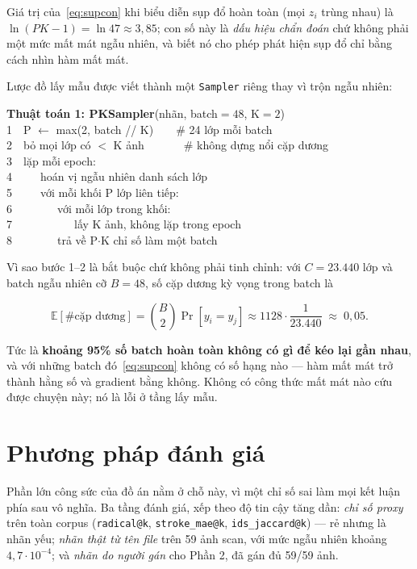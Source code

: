 \documentclass[conference,a4paper]{IEEEtran}
\newcommand{\code}[1]{{\small\texttt{#1}}}
\begin{document}
Giá trị của~\eqref{eq:supcon} khi biểu diễn sụp đổ hoàn toàn (mọi $z_i$ trùng nhau) là
$\ln(PK - 1) = \ln 47 \approx 3{,}85$; con số này là \emph{dấu hiệu chẩn đoán} chứ không phải một
mức mất mát ngẫu nhiên, và biết nó cho phép phát hiện sụp đổ chỉ bằng cách nhìn hàm mất mát.

\medskip
Lược đồ lấy mẫu được viết thành một \code{Sampler} riêng thay vì trộn ngẫu nhiên:

{\footnotesize\ttfamily\raggedright
\textbf{Thuật toán 1: PKSampler}(nhãn, batch$=48$, K$=2$)\\
1\ \ P $\leftarrow$ max(2, batch // K)\ \ \ \ \# 24 lớp mỗi batch\\
2\ \ bỏ mọi lớp có $<$ K ảnh\ \ \ \ \ \ \ \# không dựng nổi cặp dương\\
3\ \ lặp mỗi epoch:\\
4\ \ \ \ \ hoán vị ngẫu nhiên danh sách lớp\\
5\ \ \ \ \ với mỗi khối P lớp liên tiếp:\\
6\ \ \ \ \ \ \ \ với mỗi lớp trong khối:\\
7\ \ \ \ \ \ \ \ \ \ \ lấy K ảnh, không lặp trong epoch\\
8\ \ \ \ \ \ \ \ trả về P$\cdot$K chỉ số làm một batch\\
}

\medskip
Vì sao bước 1--2 là bắt buộc chứ không phải tinh chỉnh: với $C = 23.440$ lớp và batch ngẫu nhiên cỡ
$B = 48$, số cặp dương kỳ vọng trong batch là

\begin{equation}
\label{eq:pairs}
\mathbb{E}[\#\text{cặp dương}] = \binom{B}{2}\Pr[y_i{=}y_j] \approx 1128 \cdot \frac{1}{23.440}
\;\approx\; 0{,}05 .
\end{equation}

Tức là \textbf{khoảng 95\% số batch hoàn toàn không có gì để kéo lại gần nhau}, và với những batch
đó~\eqref{eq:supcon} không có số hạng nào --- hàm mất mát trở thành hằng số và gradient bằng không.
Không có công thức mất mát nào cứu được chuyện này; nó là lỗi ở tầng lấy mẫu.

\section{Phương pháp đánh giá}
\label{sec:eval}

Phần lớn công sức của đồ án nằm ở chỗ này, vì một chỉ số sai làm mọi kết luận phía sau vô nghĩa. Ba
tầng đánh giá, xếp theo độ tin cậy tăng dần: \emph{chỉ số proxy} trên toàn corpus (\code{radical@k},
\code{stroke\_mae@k}, \code{ids\_jaccard@k}) --- rẻ nhưng là nhãn yếu; \emph{nhãn thật từ tên file}
trên 59 ảnh scan, với mức ngẫu nhiên khoảng $4{,}7\cdot10^{-4}$; và \emph{nhãn do người gán} cho
Phần 2, đã gán đủ 59/59 ảnh.
\end{document}
